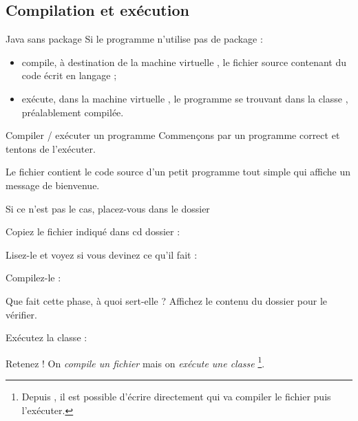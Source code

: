 \documentclass[a4paper,11pt]{style-esi/td}
\begin{document}
	\subsection{Compilation et exécution}

		\begin{theorie}{Java sans package}
			Si le programme  n'utilise pas de package :
			\begin{itemize}
				\item {} compile, à destination
				      de la machine virtuelle , le fichier source 
				       contenant du code écrit en langage
				       ;
				\item {} exécute, dans la machine virtuelle 
				      , le programme se trouvant dans la classe 
				      , préalablement compilée.
			\end{itemize}
		\end{theorie}

		\begin{Tutoriel}{Compiler / exécuter un programme} 
			Commençons par un programme correct et tentons de l'exécuter.  
		
			Le fichier  
			contient le code source d'un petit pro\-gram\-me  tout simple 
			qui affiche un message de bienvenue. 
			
			\begin{steps}	
			\item 
				Si ce n'est pas le cas, placez-vous dans le dossier 
			\item 
				Copiez le fichier indiqué dans cd dossier :
			\item 
				Lisez-le et voyez si vous devinez ce qu'il fait : 
			\item 
				Compilez-le : 
			\item 
				Que fait cette phase, à quoi sert-elle ?
				Affichez le contenu du dossier pour le vérifier.
			\item Exécutez la classe : 
			\end{steps}			
		\end{Tutoriel}

		\begin{alerttbox}{Retenez !} 
			On \emph{compile un fichier} mais on \emph{exécute une classe}%
			\footnote{
				Depuis ,
				il est possible d'écrire directement 
				 qui va compiler le fichier puis l'exécuter.	
			}.
		\end{alerttbox}
\end{document}
